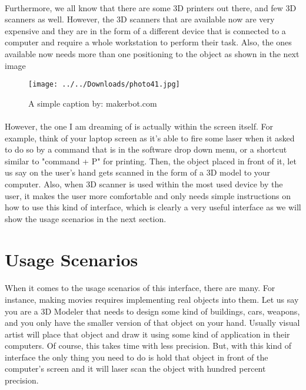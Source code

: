 \documentclass[12pt, oneside]{article}   	%
\begin{document}
\paragraph{}
Furthermore, we all know that there are some 3D printers out there, and few 3D scanners as well.  However, the 3D scanners that are available now are very expensive and they are in the form of a different device that is connected to a computer and require a whole workstation to perform their task.  Also, the ones available now needs more than one positioning to the object as shown in the next image

\begin{figure}[ht!]
\centering
\texttt{[image: ../../Downloads/photo41.jpg]}
\caption{A simple caption by: makerbot.com}
\label{overflow}
\end{figure}

\paragraph{}
  However, the one I am dreaming of is actually within the screen itself.  For example, think of your laptop screen as it's able to fire some laser when it asked to do so by a command that is in the software drop down menu, or a shortcut similar to "command + P" for printing. Then, the object placed in front of it, let us say on the user's hand gets scanned in the form of a 3D model to your computer. Also, when 3D scanner is used within the most used device by the user, it makes the user more comfortable and only needs simple instructions on how to use this kind of interface, which is clearly a very useful interface as we will show the usage scenarios in the next section.
\section{Usage Scenarios}
\paragraph{}
When it comes to the usage scenarios of this interface, there are many.  For instance, making movies requires implementing real objects into them. Let us say you are a 3D Modeler that needs to design some kind of buildings, cars, weapons, and you only have the smaller version of that object on your hand. Usually visual artist will place that object and draw it using some kind of application in their computers. Of course, this takes time with less precision.  But, with this kind of interface the only thing you need to do is hold that object in front of the computer's screen and it will laser scan the object with hundred percent precision.  
\end{document}
